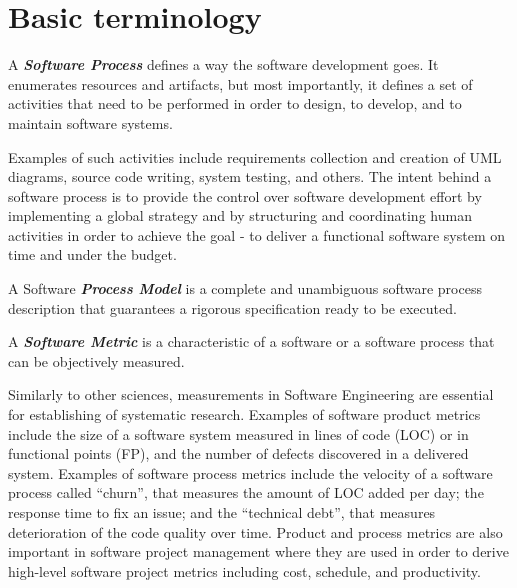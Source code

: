 \section{Basic terminology}\label{section_terminology}
\begin{defn}\label{def_process}
A \textbf{\textit{Software Process}} defines a way the software development goes. It enumerates
resources and artifacts, but most importantly, it defines a set of activities that need to be 
performed in order to design, to develop, and to maintain software systems.
\end{defn}
Examples of such activities include requirements collection and creation of UML diagrams, 
source code writing, system testing, and others. The intent behind a software process is to provide 
the control over software development effort by implementing a global strategy and by structuring
and coordinating human activities in order to achieve the goal - to deliver a functional
software system on time and under the budget. 


\begin{defn}\label{def_process_model}
A Software \textbf{\textit{Process Model}} is a complete and unambiguous software process description 
that guarantees a rigorous specification ready to be executed.
\end{defn}

\begin{defn}\label{def_metric}
A \textbf{\textit{Software Metric}} is a characteristic of a software or a software process that can be 
objectively measured.
\end{defn}
Similarly to other sciences, measurements in Software Engineering are essential for establishing of systematic 
research. Examples of software product metrics include the size of a software system measured in lines of code 
(LOC) or in functional points (FP), and the number of defects discovered in a delivered system. 
Examples of software process metrics include the velocity of a software process called ``churn'', that 
measures the amount of LOC added per day; the response time to fix an issue; and the ``technical debt'', 
that measures deterioration of the code quality over time. 
Product and process metrics are also important in software project management where they are used in order to 
derive high-level software project metrics including cost, schedule, and productivity.

